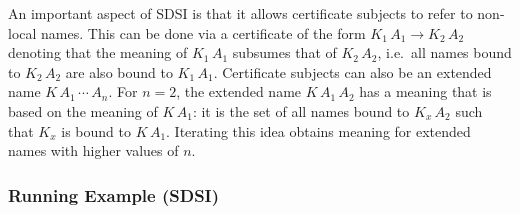 An important aspect of SDSI is that it allows certificate subjects to
refer to non-local names. This can be done via a certificate of the
form $K_1\,A_1 \rightarrow K_2\,A_2$ denoting that the meaning of
$K_1\,A_1$ subsumes that of $K_2\,A_2$, i.e.~all names bound to
$K_2\,A_2$ are also bound to $K_1\,A_1$.  Certificate subjects can
also be an extended name $K\,A_1\,\cdots\,A_n$.  For $n=2$, the
extended name $K\,A_1\,A_2$ has a meaning that is based on the meaning
of $K\,A_1$: it is the set of all names bound to $K_x\,A_2$ such that
$K_x$ is bound to $K\,A_1$.  Iterating this idea obtains meaning for
extended names with higher values of $n$.

%

\subsubsection{Running Example (SDSI)}

